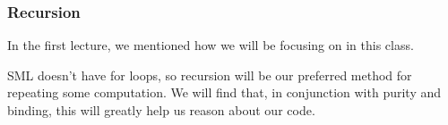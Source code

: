 \documentclass[aspectratio=169, handout]{beamer}
\begin{document}







\begin{frame}[fragile]
  \frametitle{Recursion}

  In the first lecture, we mentioned how we will be focusing on
   in this class.

  \pause
  \vspace{\fill}


  \pause
  \vspace{5pt}


  \pause
  \vspace{\fill}

  SML doesn't have for loops, so recursion will be our preferred method
  for repeating some computation. We will find that, in conjunction with
  purity and binding, this will greatly help us reason about our code.
\end{frame}
\end{document}
